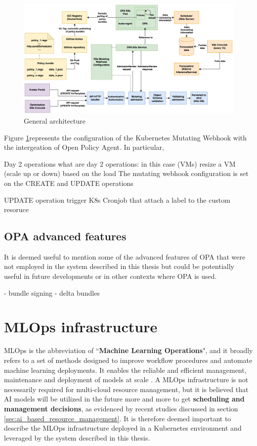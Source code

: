 \begin{figure}[htb]
\centering
\includegraphics[width=1\linewidth]{images/architecture.png}
\caption{General architecture}
\label{fig:architecture}
\end{figure}

Figure \ref{fig:architecture}represents the configuration of the Kubernetes Mutating Webhook with the intergeation of Open Policy Agent.
In particular, 




Day 2 operations
what are day 2 operations: in this case (VMs) resize a VM (scale up or down) based on the load
The mutating webhook configuration is set on the CREATE and UPDATE operations

UPDATE operation trigger
K8s Cronjob that attach a label to the custom resoruce 

\subsection{OPA advanced features}

It is deemed useful to mention some of the advanced features of OPA that were not employed in the system described in this thesis but could be potentially useful in future developments or in other contexts where OPA is used.

- bundle signing
- delta bundles

\newpage

\section{MLOps infrastructure}

MLOps is the abbreviation of ``\textbf{Machine Learning Operations}", and it broadly refers to a set of methods designed to improve workflow procedures and automate machine learning deployments. 
It enables the reliable and efficient management, maintenance and deployment of models at scale \cite{mlops_ubuntu}.
A MLOps infrastructure is not necessarily required for multi-cloud resource management, but it is believed that AI models will be utilized in the future more and more to get \textbf{scheduling and management decisions}, as evidenced by recent studies discussed in section \ref{sec:ai_based_resource_management}.
It is therefore deemed important to describe the MLOps infrastructure deployed in a Kubernetes environment and leveraged by the system described in this thesis.

